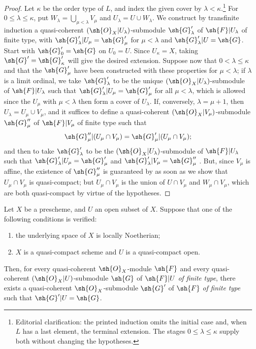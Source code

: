 \begin{proof}
Let $\kappa$ be the order type of $L$, and index the given cover by $\lambda<\kappa$.\footnote{Editorial clarification: the printed induction omits the initial case and, when $L$ has a last element, the terminal extension. The stages $0\leq\lambda\leq\kappa$ supply both without changing the hypotheses.}
For $0\leq\lambda\leq\kappa$, put $W_\lambda=\bigcup_{\mu<\lambda}V_\mu$ and $U_\lambda=U\cup W_\lambda$.
We construct by transfinite induction a quasi-coherent $(\sh{O}_X|U_\lambda)$-submodule $\sh{G}'_\lambda$
of $\sh{F}|U_\lambda$ of finite type, with $\sh{G}'_\lambda|U_\mu=\sh{G}'_\mu$ for $\mu<\lambda$ and $\sh{G}'_\lambda|U=\sh{G}$.
Start with $\sh{G}'_0=\sh{G}$ on $U_0=U$. Since $U_\kappa=X$, taking $\sh{G}'=\sh{G}'_\kappa$ will give the desired extension.
Suppose now that $0<\lambda\leq\kappa$ and that the $\sh{G}'_\mu$ have been constructed with these properties for $\mu<\lambda$;
if $\lambda$ is a limit ordinal, we take
$\sh{G}'_\lambda$ to be the unique $(\sh{O}_X|U_\lambda)$-submodule of $\sh{F}|U_\lambda$ such that
$\sh{G}'_\lambda|U_\mu=\sh{G}'_\mu$ for all $\mu<\lambda$, which is allowed since the $U_\mu$
with $\mu<\lambda$ then form a cover of $U_\lambda$. If, conversely, $\lambda=\mu+1$, then
$U_\lambda=U_\mu\cup V_\mu$, and it suffices to define a quasi-coherent
$(\sh{O}_X|V_\mu)$-submodule $\sh{G}''_\mu$ of $\sh{F}|V_\mu$ of finite type such that
\[
  \sh{G}''_\mu|(U_\mu\cap V_\mu)=\sh{G}'_\mu|(U_\mu\cap V_\mu);
\]
and then to take $\sh{G}'_\lambda$ to be the $(\sh{O}_X|U_\lambda)$-submodule of
$\sh{F}|U_\lambda$ such that $\sh{G}'_\lambda|U_\mu=\sh{G}'_\mu$ and
$\sh{G}'_\lambda|V_\mu=\sh{G}''_\mu$ . But, since $V_\mu$ is affine, the
existence of $\sh{G}''_\mu$ is guaranteed by  as soon as we show that
$U_\mu\cap V_\mu$ is quasi-compact; but $U_\mu\cap V_\mu$ is the union of $U\cap V_\mu$ and
$W_\mu\cap V_\mu$, which are both quasi-compact by virtue of the hypotheses.
\end{proof}

\begin{theorem}[9.4.7]
\label{I.9.4.7}
Let $X$ be a prescheme, and $U$ an open subset of $X$. Suppose that one of the following conditions is verified:
\begin{enumerate}
  \item[{\rm(a)}] the underlying space of $X$ is locally Noetherian;
  \item[{\rm(b)}] $X$ is a quasi-compact scheme and $U$ is a quasi-compact open.
\end{enumerate}
Then, for every quasi-coherent $\sh{O}_X$-module $\sh{F}$ and every quasi-coherent
$(\sh{O}_X|U)$-submodule $\sh{G}$ of $\sh{F}|U$ \emph{of finite type}, there exists a
quasi-coherent $\sh{O}_X$-submodule $\sh{G}'$ of $\sh{F}$ \emph{of finite type} such that
$\sh{G}'|U=\sh{G}$.
\end{theorem}

